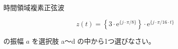 時間領域複素正弦波

\[
z(t) =  \left \{ 3 \cdot \textrm{e}^{\{j \cdot \pi/8 \}} \right \} \cdot \textrm{e}^{\{ j \cdot \pi/16 \cdot t \}}
\]

\bigskip
\noindent の振幅 $a$ を選択肢 a〜d の中から1つ選びなさい。
